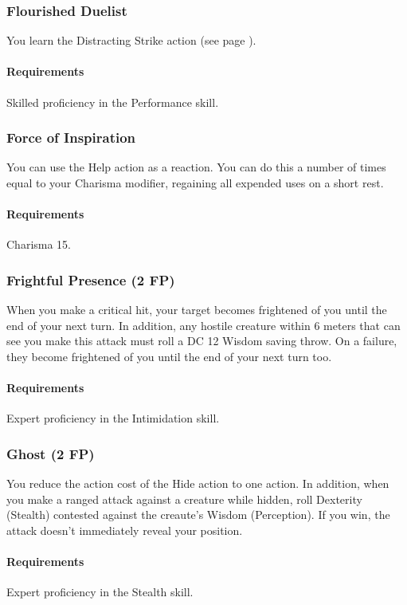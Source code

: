 \subsubsection{Flourished Duelist} \label{feat::flourishedduelist}
    You learn the Distracting Strike action (see page \pageref{act::distractingstrike}).
    \paragraph{Requirements} Skilled proficiency in the Performance skill.
\subsubsection{Force of Inspiration} \label{feat::forceofinspiration}
    You can use the Help action as a reaction.
    You can do this a number of times equal to your Charisma modifier, regaining all expended uses on a short rest.
    \paragraph{Requirements} Charisma 15.
\subsubsection{Frightful Presence (2 FP)} \label{feat::frightfulpresence}
    When you make a critical hit, your target becomes frightened of you until the end of your next turn.
    In addition, any hostile creature within 6 meters that can see you make this attack must roll a DC 12 Wisdom saving throw.
    On a failure, they become frightened of you until the end of your next turn too.
    \paragraph{Requirements} Expert proficiency in the Intimidation skill.
\subsubsection{Ghost (2 FP)} \label{feat::ghost}
    You reduce the action cost of the Hide action to one action.
    In addition, when you make a ranged attack against a creature while hidden, roll Dexterity (Stealth) contested against the creaute's Wisdom (Perception).
    If you win, the attack doesn't immediately reveal your position.
    \paragraph{Requirements} Expert proficiency in the Stealth skill.
